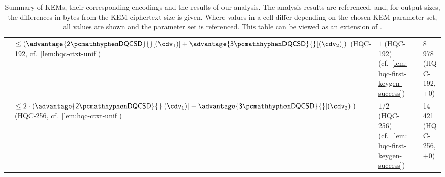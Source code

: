 \begin{table}
{\begin{tabular}{@{} L{0.18\textwidth-\tabcolsep} | L{0.41\tabcolsep} L{0.19\tabcolsep} L{0.16\tabcolsep} L{0.23\textwidth-\tabcolsep} @{}}
        & $\leq \left( \advantage{\twodqcsd}{}[(\cdv_1)] + \advantage{\threedqcsd}{}[(\cdv_2)] \right)$\newline
        (\textsf{HQC-192}, cf.~\cref{lem:hqc-ctxt-unif})\vspace{0.5em}
        & $1$ (\textsf{HQC-192})\newline
        (cf.~\cref{lem:hqc-first-keygen-success})
        &
        & 8 978 (\textsf{HQC-192}, +0)
        \\

        & $\leq 2 \cdot \left( \advantage{\twodqcsd}{}[(\cdv_1)] + \advantage{\threedqcsd}{}[(\cdv_2)] \right)$\newline
        (\textsf{HQC-256}, cf.~\cref{lem:hqc-ctxt-unif})\vspace{0.5em}
        & $1/2$ (\textsf{HQC-256})\newline
        (cf.~\cref{lem:hqc-first-keygen-success})
        &
        & 14 421 (\textsf{HQC-256}, +0)
    \end{tabular}
    }
    \caption[
        Summary of KEMs, their corresponding encodings and the results of our analysis.
    ]{
        Summary of KEMs, their corresponding encodings and the results of our analysis. The analysis results are referenced, and, for output sizes, the differences in bytes from the KEM ciphertext size is given. Where values in a cell differ depending on the chosen KEM parameter set, all values are shown and the parameter set is referenced. This table can be viewed as an extension of \cite[Table~2]{CCS:GunSteVei24}.
    }
    \label{tab:obfuscation-summary}
\end{table}
